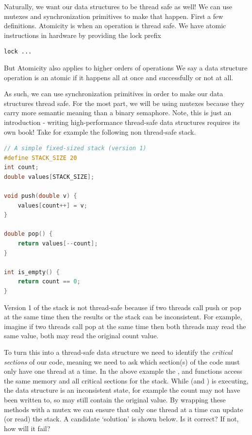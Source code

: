 Naturally, we want our data structures to be thread safe as well!
We can use mutexes and synchronization primitives to make that happen.
First a few definitions.
Atomicity is when an operation is thread safe.
We have atomic instructions in hardware by providing the lock prefix
\begin{lstlisting}
lock ...
\end{lstlisting}
But Atomicity also applies to higher orders of operations
We say a data structure operation is an atomic if it happens all at once and successfully or not at all.

As such, we can use synchronization primitives in order to make our data structures thread safe.
For the most part, we will be using mutexes because they carry more semantic meaning than a binary semaphore.
Note, this is just an introduction - writing high-performance thread-safe data structures requires its own book!
Take for example the following non thread-safe stack.

\begin{lstlisting}[language=C]
// A simple fixed-sized stack (version 1)
#define STACK_SIZE 20
int count;
double values[STACK_SIZE];

void push(double v) {
    values[count++] = v;
}

double pop() {
    return values[--count];
}

int is_empty() {
    return count == 0;
}
\end{lstlisting}

Version 1 of the stack is not thread-safe because if two threads call push or pop at the same time then the results or the stack can be inconsistent.
For example, imagine if two threads call pop at the same time then both threads may read the same value, both may read the original count value.

To turn this into a thread-safe data structure we need to identify the \emph{critical sections} of our code, meaning we need to ask which section(s) of the code must only have one thread at a time.
In the above example the , and  functions access the same memory and all critical sections for the stack.
While  (and ) is executing, the data structure is an inconsistent state, for example the count may not have been written to, so may still contain the original value.
By wrapping these methods with a mutex we can ensure that only one thread at a time can update (or read) the stack.
A candidate `solution' is shown below.
Is it correct? If not, how will it fail?

